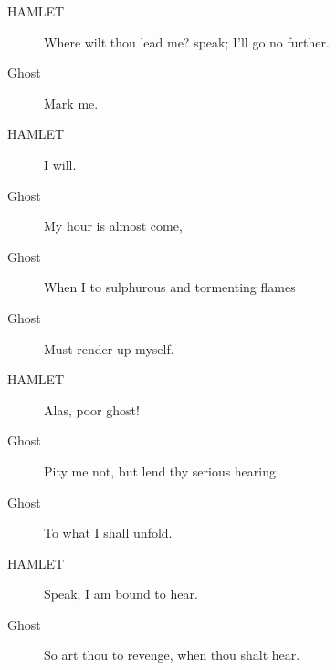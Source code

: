 \documentclass{article}
\begin{document}
\begin{description}
            
\item[HAMLET] Where wilt thou lead me? speak; I'll go no further.
\end{description}
          
\begin{description}
            
\item[Ghost] Mark me.
\end{description}
          
\begin{description}
            
\item[HAMLET] I will.
\end{description}
          
\begin{description}
            
\item[Ghost] My hour is almost come,
\item[Ghost] When I to sulphurous and tormenting flames
\item[Ghost] Must render up myself.
\end{description}
          
\begin{description}
            
\item[HAMLET] Alas, poor ghost!
\end{description}
          
\begin{description}
            
\item[Ghost] Pity me not, but lend thy serious hearing
\item[Ghost] To what I shall unfold.
\end{description}
          
\begin{description}
            
\item[HAMLET] Speak; I am bound to hear.
\end{description}
          
\begin{description}
            
\item[Ghost] So art thou to revenge, when thou shalt hear.
\end{description}
          
\end{document}
